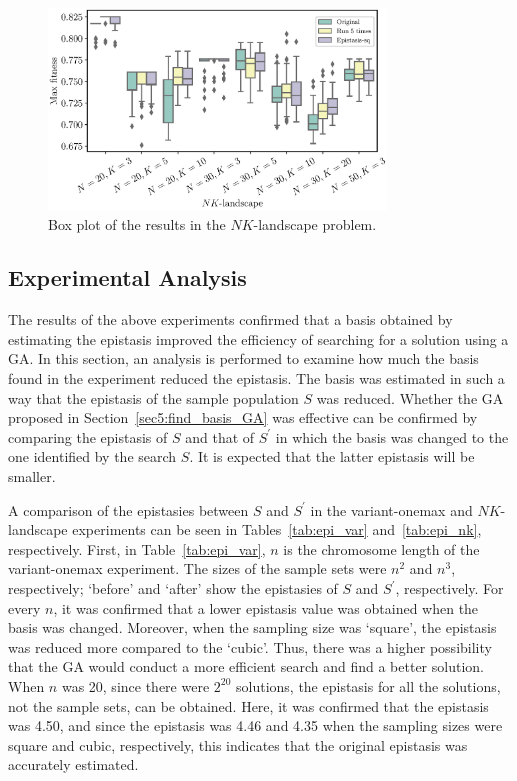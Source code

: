 \begin{figure}[ht!]
	\centering
	\includegraphics[width=0.8\textwidth]{./boxplot_NK}
	\caption{Box plot of the results in the $ NK $-landscape problem.} \label{fig:boxplot_nk}
\end{figure}

\subsection{Experimental Analysis}
The results of the above experiments confirmed that a basis obtained by estimating the epistasis improved the efficiency of searching for a solution using a GA. In this section, an analysis is performed to examine how much the basis found in the experiment reduced the epistasis. The basis was estimated in such a way that the epistasis of the sample population $ S $ was reduced. Whether the GA proposed in Section~\ref{sec5:find_basis_GA} was effective can be confirmed by comparing the epistasis of $ S $ and that of $ S^\prime $ in which the basis was changed to the one identified by the search $ S $. It is expected that the latter epistasis will be smaller.

A comparison of the epistasies between $ S $ and $ S^\prime $ in the variant-onemax and $ NK $-landscape experiments can be seen in Tables~\ref{tab:epi_var} and~\ref{tab:epi_nk}, respectively. First, in Table~\ref{tab:epi_var}, $ n $ is the chromosome length of the variant-onemax experiment. The sizes of the sample sets were $ n^2 $ and $ n^3 $, respectively; `before' and `after' show the epistasies of $ S $ and $ S^\prime $, respectively. For every $ n $, it was confirmed that a lower epistasis value was obtained when the basis was changed. Moreover, when the sampling size was `square', the epistasis was reduced more compared to the `cubic'. Thus, there was a higher possibility that the GA would conduct a more efficient search and find a better solution. When $ n $ was 20, since there were $ 2^{20} $ solutions, the epistasis for all the solutions, not the sample sets, can be obtained. Here, it was confirmed that the epistasis was 4.50, and since the epistasis was 4.46 and 4.35 when the sampling sizes were square and cubic, respectively, this indicates that the original epistasis was accurately estimated.

